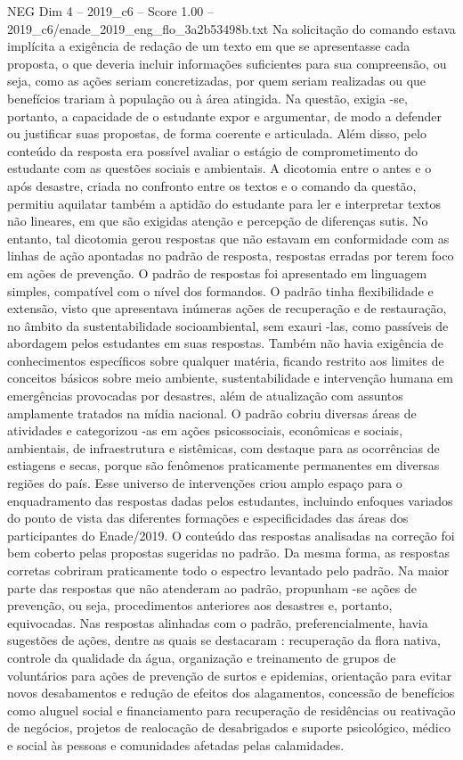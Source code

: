 \begin{textsample}{NEG Dim 4 – 2019\_c6 – Score 1.00 – 2019\_c6/enade\_2019\_eng\_flo\_3a2b53498b.txt}
Na solicitação do comando estava implícita a exigência de redação de um texto em que se apresentasse cada proposta, o que deveria incluir informações suficientes para sua compreensão, ou seja, como as ações seriam concretizadas, por quem seriam realizadas ou que benefícios trariam à população ou à área atingida.
Na questão, exigia -se, portanto, a capacidade de o estudante expor e argumentar, de modo a defender ou justificar suas propostas, de forma coerente e articulada.
Além disso, pelo conteúdo da resposta era possível avaliar o estágio de comprometimento do estudante com as questões sociais e ambientais.
A dicotomia entre o antes e o após desastre, criada no confronto entre os textos e o comando da questão, permitiu aquilatar também a aptidão do estudante para ler e interpretar textos não lineares, em que são exigidas atenção e percepção de diferenças sutis.
No entanto, tal dicotomia gerou respostas que não estavam em conformidade com as linhas de ação apontadas no padrão de resposta, respostas erradas por terem foco em ações de prevenção.
O padrão de respostas foi apresentado em linguagem simples, compatível com o nível dos formandos.
O padrão tinha flexibilidade e extensão, visto que apresentava inúmeras ações de recuperação e de restauração, no âmbito da sustentabilidade socioambiental, sem exauri -las, como passíveis de abordagem pelos estudantes em suas respostas.
Também não havia exigência de conhecimentos específicos sobre qualquer matéria, ficando restrito aos limites de conceitos básicos sobre meio ambiente, sustentabilidade e intervenção humana em emergências provocadas por desastres, além de atualização com assuntos amplamente tratados na mídia nacional.
O padrão cobriu diversas áreas de atividades e categorizou -as em ações psicossociais, econômicas e sociais, ambientais, de infraestrutura e sistêmicas, com destaque para as ocorrências de estiagens e secas, porque são fenômenos praticamente permanentes em diversas regiões do país.
Esse universo de intervenções criou amplo espaço para o enquadramento das respostas dadas pelos estudantes, incluindo enfoques variados do ponto de vista das diferentes formações e especificidades das áreas dos participantes do Enade/2019.
O conteúdo das respostas analisadas na correção foi bem coberto pelas propostas sugeridas no padrão.
Da mesma forma, as respostas corretas cobriram praticamente todo o espectro levantado pelo padrão.
Na maior parte das respostas que não atenderam ao padrão, propunham -se ações de prevenção, ou seja, procedimentos anteriores aos desastres e, portanto, equivocadas.
Nas respostas alinhadas com o padrão, preferencialmente, havia sugestões de ações, dentre as quais se destacaram : recuperação da flora nativa, controle da qualidade da água, organização e treinamento de grupos de voluntários para ações de prevenção de surtos e epidemias, orientação para evitar novos desabamentos e redução de efeitos dos alagamentos, concessão de benefícios como aluguel social e financiamento para recuperação de residências ou reativação de negócios, projetos de realocação de desabrigados e suporte psicológico, médico e social às pessoas e comunidades afetadas pelas calamidades.

\end{textsample}
